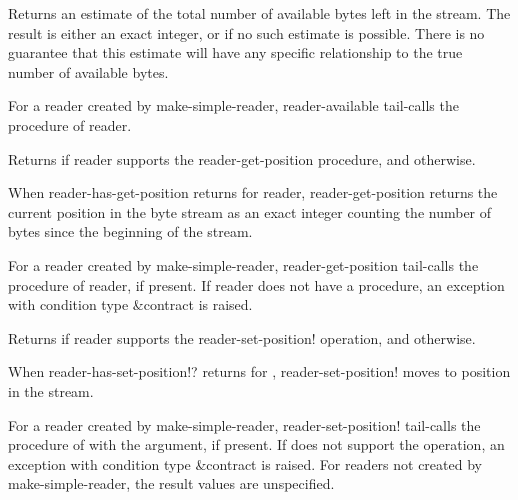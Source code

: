 \begin{entry}{%
}
   
Returns an estimate of the total number of available bytes left in the
stream. The result is either an exact integer, or \schfalse{} if no such
estimate is possible. There is no guarantee that this estimate will have
any specific relationship to the true number of available bytes.
   
For a reader created by {\cf make-simple-reader}, {\cf reader-available}
tail-calls the  procedure of reader.
\end{entry}   

\begin{entry}{%
}
   
Returns \schtrue{} if reader supports the {\cf reader-get-position}
procedure, and \schfalse{} otherwise.
\end{entry}

\begin{entry}{%
}
   
When {\cf reader-has-get-position} returns \schtrue{} for reader,
{\cf reader-get-position}
returns the current position in the byte stream as an exact integer
counting the number of bytes since the beginning of the stream.
   
For a reader created by {\cf make-simple-reader}, {\cf reader-get-position} tail-calls the
 procedure of reader, if present. If reader does not
have a  procedure, an exception with condition type
{\cf\&contract} is raised.
\end{entry}

\begin{entry}{%
}
   
Returns \schtrue{} if reader supports the {\cf reader-set-position!} operation, and
\schfalse{} otherwise.
\end{entry}

\begin{entry}{%
}

When {\cf reader-has-set-position!?} returns \schtrue{} for
, {\cf reader-set-position!}
moves to position  in the stream.
 
For a reader created by {\cf make-simple-reader}, {\cf reader-set-position!} tail-calls the
 procedure of  with the 
argument, if present.  If  does not support the operation,
an {\cf exception} with condition type {\cf\&contract} is raised.
For readers not created by {\cf make-simple-reader}, the result values
are unspecified.
\end{entry}

